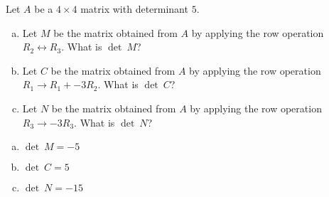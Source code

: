 
\begin{exerciseStatement}


Let \(A\) be a \(4 \times 4\) matrix with determinant \( 5 \).


\begin{enumerate}[(a)]
\item Let \(M\) be the matrix obtained from \(A\) by applying the row operation \( R_2 \leftrightarrow R_3 \). What is \(\operatorname{det}\ M\)?
\item Let \(C\) be the matrix obtained from \(A\) by applying the row operation \( R_1 \to R_1 + -3R_2 \). What is \(\operatorname{det}\ C\)?
\item Let \(N\) be the matrix obtained from \(A\) by applying the row operation \( R_3 \to -3R_3 \). What is \(\operatorname{det}\ N\)?
\end{enumerate}
    
\end{exerciseStatement}
    
\begin{exerciseAnswer} 

\begin{enumerate}[(a)]
\item \(\operatorname{det}\ M= -5 \)
\item \(\operatorname{det}\ C= 5 \)
\item \(\operatorname{det}\ N= -15 \)
\end{enumerate}
    
\end{exerciseAnswer}
    
